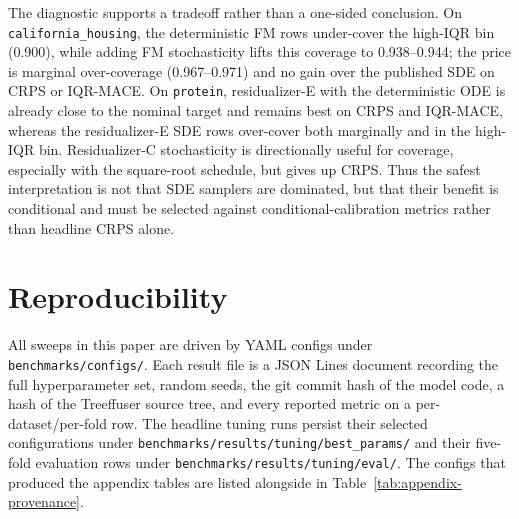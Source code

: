 \documentclass{tpm2026}
\begin{document}
The diagnostic supports a tradeoff rather than a one-sided conclusion. On \texttt{california\_housing}, the deterministic FM rows under-cover the high-IQR bin (0.900), while adding FM stochasticity lifts this coverage to 0.938--0.944; the price is marginal over-coverage (0.967--0.971) and no gain over the published SDE on CRPS or IQR-MACE. On \texttt{protein}, residualizer-E with the deterministic ODE is already close to the nominal target and remains best on CRPS and IQR-MACE, whereas the residualizer-E SDE rows over-cover both marginally and in the high-IQR bin. Residualizer-C stochasticity is directionally useful for coverage, especially with the square-root schedule, but gives up CRPS. Thus the safest interpretation is not that SDE samplers are dominated, but that their benefit is conditional and must be selected against conditional-calibration metrics rather than headline CRPS alone.

\section{Reproducibility}\label{app:repro}

All sweeps in this paper are driven by YAML configs under \texttt{benchmarks/configs/}. Each result file is a JSON Lines document recording the full hyperparameter set, random seeds, the git commit hash of the model code, a hash of the Treeffuser source tree, and every reported metric on a per-dataset/per-fold row. The headline tuning runs persist their selected configurations under \texttt{benchmarks/results/tuning/best\_params/} and their five-fold evaluation rows under \texttt{benchmarks/results/tuning/eval/}. The configs that produced the appendix tables are listed alongside in Table~\ref{tab:appendix-provenance}.
\end{document}
